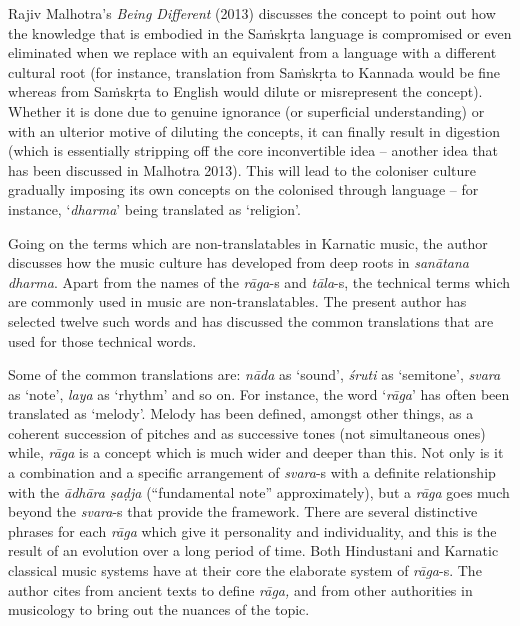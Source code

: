 Rajiv Malhotra’s \textit{Being Different} (2013) discusses the concept to point out how the knowledge that is embodied in the Saṁskṛta language is compromised or even eliminated when we replace with an equivalent from a language with a different cultural root (for instance, translation from Saṁskṛta to Kannada would be fine whereas from Saṁskṛta to English would dilute or misrepresent the concept). Whether it is done due to genuine ignorance (or superficial understanding) or with an ulterior motive of diluting the concepts, it can finally result in digestion (which is essentially stripping off the core inconvertible idea – another idea that has been discussed in Malhotra 2013). This will lead to the coloniser culture gradually imposing its own concepts on the colonised through language – for instance, ‘\textit{dharma}’ being translated as ‘religion’.

Going on the terms which are non-translatables in Karnatic music, the author discusses how the music culture has developed from deep roots in \textit{sanātana dharma}. Apart from the names of the \textit{rāga}-s and \textit{tāla}-s, the technical terms which are commonly used in music are non-translatables. The present author has selected twelve such words and has discussed the common translations that are used for those technical words.

Some of the common translations are: \textit{nāda} as ‘sound’, \textit{śruti} as ‘semitone’, \textit{svara} as ‘note’, \textit{laya} as ‘rhythm’ and so on. For instance, the word ‘\textit{rāga}’ has often been translated as ‘melody’. Melody has been defined, amongst other things, as a coherent succession of pitches and as successive tones (not simultaneous ones) while, \textit{rāga} is a concept which is much wider and deeper than this. Not only is it a combination and a specific arrangement of \textit{svara}-s with a definite relationship with the \textit{ādhāra ṣaḍja} (“fundamental note” approximately), but a \textit{rāga} goes much beyond the \textit{svara}-s that provide the framework. There are several distinctive phrases for each \textit{rāga} which give it personality and individuality, and this is the result of an evolution over a long period of time. Both Hindustani and Karnatic classical music systems have at their core the elaborate system of \textit{rāga}-s. The author cites from ancient texts to define \textit{rāga,} and from other authorities in musicology to bring out the nuances of the topic.

